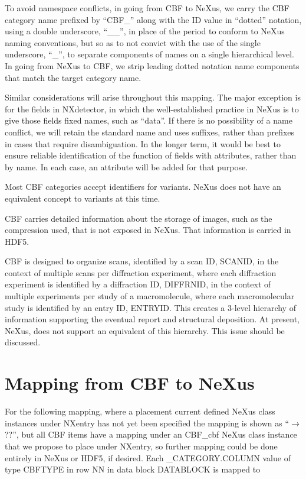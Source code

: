 \documentclass[11pt]{article}
\begin{document}
To avoid namespace conflicts, in going from CBF to NeXus, we carry the CBF category name 
prefixed by ``CBF\_'' along with the
ID value in ``dotted'' notation, using a double underscore, ``\_\_'', in place
of the period to conform to NeXus naming conventions, but so as to not
convict with the use of the single underscore, ``\_'', to separate components
of names on a single hierarchical level.  In going from NeXus to CBF, we strip 
leading dotted notation name components that match the target category name.

Similar considerations will arise throughout this mapping.  The major exception is
for the fields in NXdetector, in which the well-established practice in NeXus is to give
those fields fixed names, such as ``data''.  If there is no possibility of a name conflict,
we will retain the standard name and uses suffixes, rather than prefixes in cases that
require disambiguation.  In the longer term, it would be best to ensure reliable 
identification of the function of fields with attributes, rather than by name.  In
each case, an attribute will be added for that purpose.

Most CBF categories accept identifiers for variants.  NeXus does not have an equivalent
concept to variants at this time.

CBF carries detailed information about the storage of images, such as the compression
used, that is not exposed in NeXus.  That information is carried in HDF5.

CBF is designed to organize scans, identified by a scan ID, SCANID, in the context of multiple
scans per diffraction experiment, where each diffraction experiment is identified by a diffraction
ID, DIFFRNID, in the context of multiple experiments per study of a macromolecule, where each
macromolecular study is identified by an entry ID, ENTRYID.  This creates a 3-level hierarchy
of information supporting the eventual report and structural deposition.  At present, NeXus,
does not support an equivalent of this hierarchy.  This issue should be discussed. 

\section{Mapping from CBF to NeXus}
\label{Mapping from CBF to NeXus}

For the following mapping, where a placement current defined NeXus class instances under 
NXentry has not yet been specified the mapping is shown as ``$\rightarrow$ ??'', 
but all CBF items have a mapping under an CBF\_cbf NeXus class instance that we propose to place under NXentry,
so further mapping could be done entirely in NeXus or HDF5, if desired.
Each \_CATEGORY.COLUMN value of type CBFTYPE in row NN in data block DATABLOCK 
is mapped to 
\end{document}
